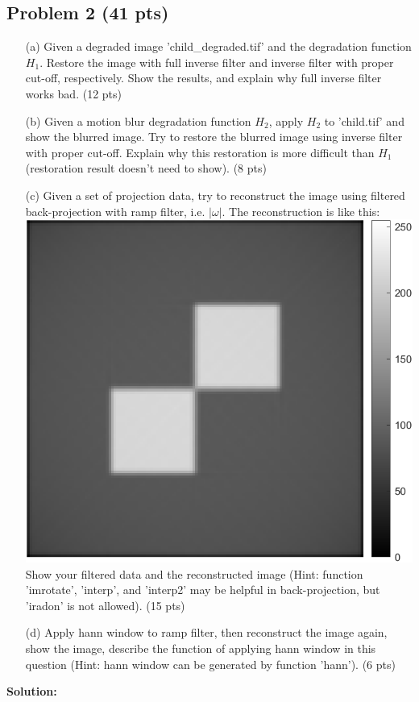 \documentclass[11pt,letterpaper]{article}
\begin{document}
\clearpage


\subsection*{Problem 2 (41 pts)}

\begin{itemize}
\item[(a)] Given a degraded image 'child\_degraded.tif' and the degradation function $H_1$. Restore the image with full inverse filter and inverse filter with proper cut-off, respectively. Show the results, and explain why full inverse filter works bad. (12 pts)
\item[(b)] Given a motion blur degradation function $H_2$, 
apply $H_2$ to 'child.tif' and show the blurred image. Try to restore the blurred image using inverse filter with proper cut-off. Explain why this restoration is more difficult than $H_1$  (restoration result doesn't need to show). (8 pts)



\item[(c)] Given a set of projection data, try to reconstruct the image using filtered back-projection with ramp filter, i.e. $|\omega|$. The reconstruction is like this:\\
\includegraphics[width=0.3\linewidth]{rec.png}\\
Show your filtered data and the reconstructed image (Hint: function 'imrotate', 'interp', and 'interp2' may be helpful in back-projection, but 'iradon' is not allowed). (15 pts)
\item[(d)] Apply hann window to ramp filter, then reconstruct the image again, show the image, describe the function of applying hann window in this question (Hint: hann window can be generated by function 'hann'). (6 pts)

\end{itemize}
\textbf{Solution:}




\clearpage
\end{document}
